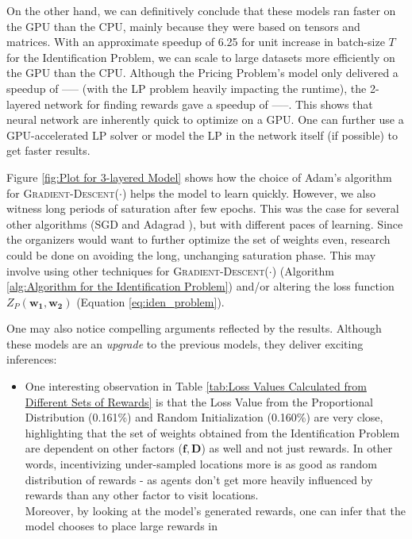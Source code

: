 \documentclass[12pt]{article}
\newcommand{\matr}[1]{\mathbf{#1}}  %
\begin{document}
    On the other hand, we can definitively conclude that these models ran faster on the GPU than the CPU, mainly because they were based on tensors and matrices. With an approximate speedup of 6.25 for unit increase in batch-size $T$ for the Identification Problem, we can scale to large datasets more efficiently on the GPU than the CPU. Although the Pricing Problem's model only delivered a speedup of ----- (with the LP problem heavily impacting the runtime), the 2-layered network for finding rewards gave a speedup of -----. This shows that neural network are inherently quick to optimize on a GPU. One can further use a GPU-accelerated LP solver or model the LP in the network itself (if possible) to get faster results.
    
    Figure \ref{fig:Plot for 3-layered Model} shows how the choice of Adam's algorithm \cite{Adam} for \textsc{Gradient-Descent}($\cdot$) helps the model to learn quickly. However, we also witness long periods of saturation after few epochs. This was the case for several other algorithms (SGD \cite{SGD} and Adagrad \cite{Adagrad}), but with different paces of learning. Since the organizers would want to further optimize the set of weights even, research could be done on avoiding the long, unchanging saturation phase. This may involve using other techniques for \textsc{Gradient-Descent}($\cdot$) (Algorithm \ref{alg:Algorithm for the Identification Problem}) and/or altering the loss function $Z_P(\matr{w_1}, \matr{w_2})$ (Equation \ref{eq:iden_problem}).
    
    One may also notice compelling arguments reflected by the results. Although these models are an \textit{upgrade} to the previous models, they deliver exciting inferences:
    \begin{itemize}
        \item One interesting observation in Table \ref{tab:Loss Values Calculated from Different Sets of Rewards} is that the Loss Value from the Proportional Distribution (0.161\%) and Random Initialization (0.160\%) are very close, highlighting that the set of weights obtained from the Identification Problem are dependent on other factors ($\matr{f}, \matr{D}$) as well and not just rewards. In other words, incentivizing under-sampled locations more is as good as random distribution of rewards - as agents don't get more heavily influenced by rewards than any other factor to visit locations.\\
        Moreover, by looking at the model's generated rewards, one can infer that the model chooses to place large rewards in 
    \end{itemize}
    
    
    \blindtext
    
    
    
    \cleardoublepage
    
\end{document}
